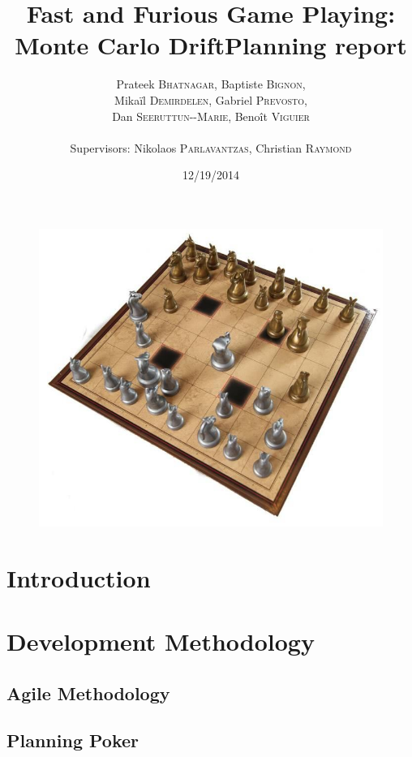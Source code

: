 \documentclass[12pt]{article}
\title{Fast and Furious Game Playing: Monte Carlo Drift\smallbreak Planning report} %
\author{Prateek \textsc{Bhatnagar}, Baptiste \textsc{Bignon}, \\
        Mikaïl \textsc{Demirdelen}, Gabriel \textsc{Prevosto}, \\
        Dan \textsc{Seeruttun-{}-Marie}, Benoît \textsc{Viguier} \\
        \\
        Supervisors: Nikolaos \textsc{Parlavantzas}, Christian \textsc{Raymond}}
\date{12/19/2014}
\begin{document}
\maketitle

\begin{figure}[!h] 
\centerline{\includegraphics[scale=0.50]{Pictures/arimaa}}
\end{figure}
\newpage

\tableofcontents
\newpage


\section{Introduction}					\label{sec:introduction} 		
\newpage	

\section{Development Methodology}					\label{sec:AgileMethod}
	\subsection{Agile Methodology}			\label{sec:method}		
	\subsection{Planning Poker}			\label{sec:PokerPlanning}			
\newpage
\end{document}
